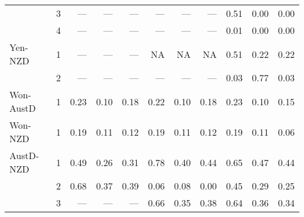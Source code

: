 \documentclass[12pt]{article}
\begin{document}
\begin{table}
\begin{threeparttable}
\begin{tabular}[c]{l c r r r | r r r | r r r}
		  & 3 & ---  & ---  & ---  & ---  & ---  & ---  & 0.51  & 0.00  & 0.00  \\
		  & 4 & ---  & ---  & ---  & ---  & ---  & ---  & 0.01  & 0.00  & 0.00  \\
\noalign{\smallskip} \noalign{\smallskip}
Yen-NZD & 1 & ---  & ---  & ---  & NA  & NA  & NA  & 0.51  & 0.22  & 0.22  \\
	    & 2 & ---  & ---  & ---  & ---  & ---  & ---  & 0.03  & 0.77  & 0.03  \\
\noalign{\smallskip}
\hline
\noalign{\smallskip} \noalign{\smallskip}
Won-AustD & 1 & 0.23  & 0.10  & 0.18  & 0.22  & 0.10  & 0.18  & 0.23  & 0.10  & 0.15  \\
\noalign{\smallskip} \noalign{\smallskip}
Won-NZD & 1 & 0.19  & 0.11  & 0.12  & 0.19  & 0.11  & 0.12  & 0.19  & 0.11  & 0.06  \\
\noalign{\smallskip}
\hline
\noalign{\smallskip} \noalign{\smallskip}
AustD-NZD & 1 & 0.49  & 0.26  & 0.31  & 0.78  & 0.40  & 0.44  & 0.65  & 0.47  & 0.44  \\
	      & 2 & 0.68  & 0.37  & 0.39  & 0.06  & 0.08  & 0.00  & 0.45  & 0.29  & 0.25  \\
	      & 3 & ---  & ---  & ---  & 0.66  & 0.35  & 0.38  & 0.64  & 0.36  & 0.34  \\
\hline \hline
	\end{tabular}
\end{threeparttable}
\end{table}
\end{document}
